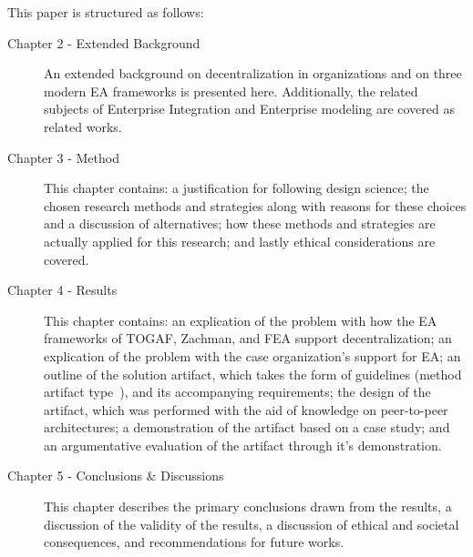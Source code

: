 This paper is structured as follows:
\begin{description}
  \item[Chapter 2 - Extended Background] An extended background on decentralization in organizations and on three modern EA frameworks is presented here. Additionally, the related subjects of Enterprise Integration and Enterprise modeling are covered as related works. 
  \item[Chapter 3 - Method] This chapter contains: a justification for following design science; the chosen research methods and strategies along with reasons for these choices and a discussion of alternatives; how these methods and strategies are actually applied for this research; and lastly ethical considerations are covered. 
  \item[Chapter 4 - Results] This chapter contains: an explication of the problem with how the EA frameworks of TOGAF, Zachman, and FEA support decentralization; an explication of the problem with the case organization's support for EA; an outline of the solution artifact, which takes the form of guidelines (method artifact type~\cite[Ch. 2.4]{johannessonPerjons2012}), and its accompanying requirements; the design of the artifact, which was performed with the aid of knowledge on peer-to-peer architectures; a demonstration of the artifact based on a case study; and an argumentative evaluation of the artifact through it's demonstration.
  \item[Chapter 5 - Conclusions \& Discussions] This chapter describes the primary conclusions drawn from the results, a discussion of the validity of the results, a discussion of ethical and societal consequences, and recommendations for future works. 
\end{description}